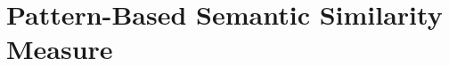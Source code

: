 
   
   
\section[Pattern-Based Measure]{Pattern-Based Semantic Similarity Measure}
\subsection{}

%
%
%
%
% 
% 
%
%

